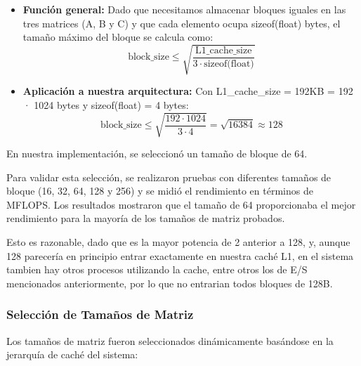 \documentclass{article}
\begin{document}
\begin{itemize}[noitemsep]
    \item \textbf{Función general:} Dado que necesitamos almacenar bloques iguales en las tres matrices (A, B y C) y que cada elemento ocupa sizeof(float) bytes, el tamaño máximo del bloque se calcula como:
    \[
    \text{block\_size} \leq \sqrt{\frac{\text{L1\_cache\_size}}{3 \cdot \text{sizeof(float)}}}
    \]

    \item \textbf{Aplicación a nuestra arquitectura:} Con L1\_cache\_size = 192KB = 192 · 1024 bytes y sizeof(float) = 4 bytes:
    \[
    \text{block\_size} \leq \sqrt{\frac{192 \cdot 1024}{3 \cdot 4}} = \sqrt{16384} \approx 128
    \]
\end{itemize}

En nuestra implementación, se seleccionó un tamaño de bloque de 64.

Para validar esta selección, se realizaron pruebas con diferentes tamaños de bloque (16, 32, 64, 128 y 256) y se midió el rendimiento en términos de MFLOPS. Los resultados mostraron que el tamaño de 64 proporcionaba el mejor rendimiento para la mayoría de los tamaños de matriz probados. 

Esto es razonable, dado que es la mayor potencia de 2 anterior a 128, y, aunque 128 parecería en principio entrar exactamente en nuestra caché L1, en el sistema tambien hay otros procesos utilizando la cache, entre otros los de E/S mencionados anteriormente, por lo que no entrarian todos bloques de 128B.

\subsubsection{Selección de Tamaños de Matriz}
Los tamaños de matriz fueron seleccionados dinámicamente basándose en la jerarquía de caché del sistema:
\end{document}
